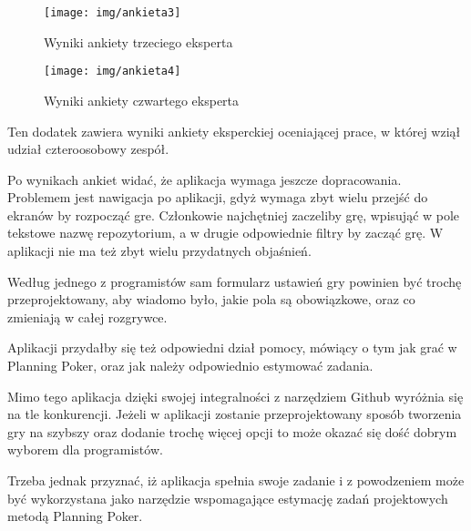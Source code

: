 \documentclass[inzynier,druk]{dyplom}
\begin{document}
\begin{figure}
	\centering\texttt{[image: img/ankieta3]}
	\caption{Wyniki ankiety trzeciego eksperta}\label{rys:ankieta3}%
\end{figure}

\begin{figure}
	\centering\texttt{[image: img/ankieta4]}
	\caption{Wyniki ankiety czwartego eksperta}\label{rys:ankieta4}%
\end{figure}

Ten dodatek zawiera wyniki ankiety eksperckiej oceniającej prace,
w której wziął udział czteroosobowy zespół.

Po wynikach ankiet widać, że aplikacja wymaga jeszcze dopracowania.
Problemem jest nawigacja po aplikacji, gdyż wymaga zbyt wielu przejść do ekranów by rozpocząć gre.
Członkowie najchętniej zaczeliby grę, wpisująć w pole tekstowe nazwę repozytorium,
a w drugie odpowiednie filtry by zacząć grę. W aplikacji nie ma też zbyt wielu przydatnych objaśnień.

Według jednego z programistów sam formularz ustawień gry powinien być trochę przeprojektowany,
aby wiadomo było, jakie pola są obowiązkowe, oraz co zmieniają w całej rozgrywce.

Aplikacji przydałby się też odpowiedni dział pomocy, mówiący o tym jak grać w Planning Poker,
oraz jak należy odpowiednio estymować zadania.

Mimo tego aplikacja dzięki swojej integralności z narzędziem Github wyróżnia się na tle konkurencji.
Jeżeli w aplikacji zostanie przeprojektowany sposób tworzenia gry na szybszy
oraz dodanie trochę więcej opcji to może okazać się dość dobrym wyborem dla programistów.

Trzeba jednak przyznać, iż aplikacja spełnia swoje zadanie i z powodzeniem może być wykorzystana
jako narzędzie wspomagające estymację zadań projektowych metodą Planning Poker.




\end{document}
